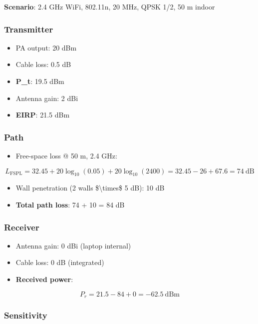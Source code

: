 \textbf{Scenario}: 2.4 GHz WiFi, 802.11n, 20 MHz, QPSK 1/2, 50 m indoor

\subsubsection{Transmitter}\label{transmitter}

\begin{itemize}
\tightlist
\item
  PA output: 20 dBm
\item
  Cable loss: 0.5 dB
\item
  \textbf{P\_t}: 19.5 dBm
\item
  Antenna gain: 2 dBi
\item
  \textbf{EIRP}: 21.5 dBm
\end{itemize}

\subsubsection{Path}\label{path}

\begin{itemize}
\tightlist
\item
  Free-space loss @ 50 m, 2.4 GHz:
\end{itemize}

\[
L_{\text{FSPL}} = 32.45 + 20\log_{10}(0.05) + 20\log_{10}(2400) = 32.45 - 26 + 67.6 = 74\ \text{dB}
\]

\begin{itemize}
\tightlist
\item
  Wall penetration (2 walls \$\textbackslash times\$ 5 dB): 10 dB
\item
  \textbf{Total path loss}: 74 + 10 = 84 dB
\end{itemize}

\subsubsection{Receiver}\label{receiver}

\begin{itemize}
\tightlist
\item
  Antenna gain: 0 dBi (laptop internal)
\item
  Cable loss: 0 dB (integrated)
\item
  \textbf{Received power}:
\end{itemize}

\[
P_r = 21.5 - 84 + 0 = -62.5\ \text{dBm}
\]

\subsubsection{Sensitivity}\label{sensitivity}

